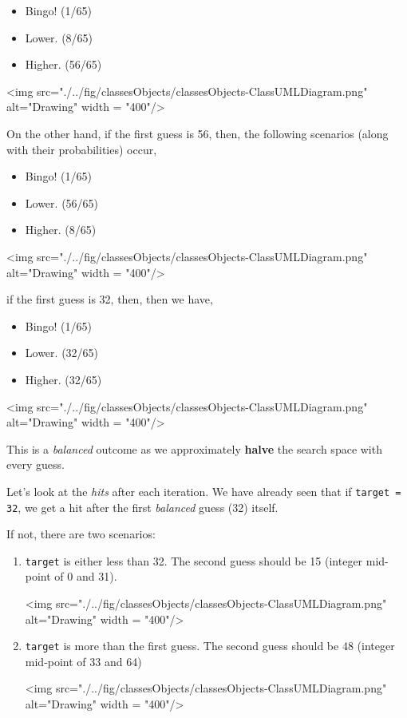 \begin{itemize}
\item Bingo! (1/65)
\item Lower. (8/65)	
\item Higher. (56/65)
\end{itemize}

<img src="./../fig/classesObjects/classesObjects-ClassUMLDiagram.png" alt="Drawing" width = "400"/>
\vskip 1cm

On the other hand, if the first guess is 56, then, the following scenarios (along with their probabilities) occur,

\begin{itemize}
\item Bingo! (1/65)
\item Lower. (56/65)	
\item Higher. (8/65)
\end{itemize}

<img src="./../fig/classesObjects/classesObjects-ClassUMLDiagram.png" alt="Drawing" width = "400"/>
\vskip 1cm

if the first guess is 32, then, then we have,

\begin{itemize}
\item Bingo! (1/65)
\item Lower. (32/65)	
\item Higher. (32/65)
\end{itemize}

<img src="./../fig/classesObjects/classesObjects-ClassUMLDiagram.png" alt="Drawing" width = "400"/>
\vskip 1cm

This is a \emph{balanced} outcome as we approximately \textbf{halve} the search space with every guess.

Let's look at the \emph{hits} after each iteration. We have already seen that if \texttt{target = 32}, we get a hit after the first \emph{balanced} guess (32) itself.

If not, there are two scenarios: 
\begin{enumerate}
	\item \texttt{target} is either less than 32. The second guess should be 15 (integer mid-point of 0 and 31). 

<img src="./../fig/classesObjects/classesObjects-ClassUMLDiagram.png" alt="Drawing" width = "400"/>
\vskip 1cm

	\item \texttt{target} is more than the first guess. The second guess should be 48 (integer mid-point of 33 and 64)

<img src="./../fig/classesObjects/classesObjects-ClassUMLDiagram.png" alt="Drawing" width = "400"/>
\end{enumerate}
	
